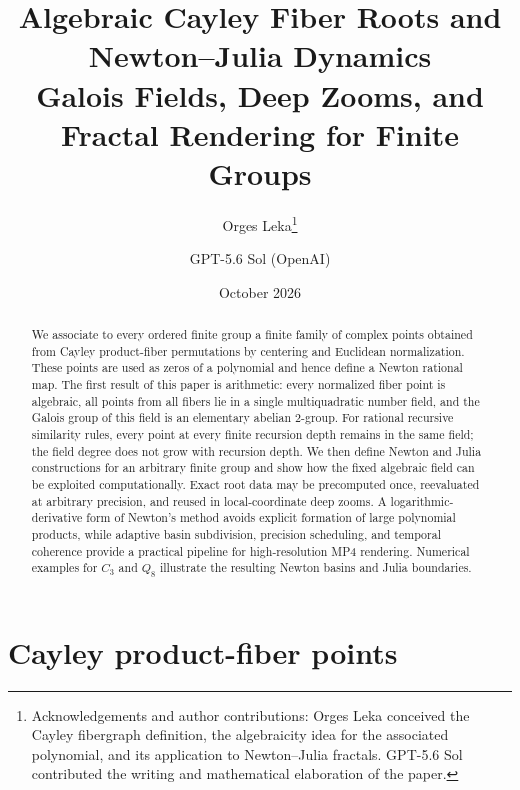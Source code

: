 \documentclass[11pt,a4paper]{article}
\title{\textbf{Algebraic Cayley Fiber Roots and Newton--Julia Dynamics}\\
\large Galois Fields, Deep Zooms, and Fractal Rendering for Finite Groups}
\author{%
Orges Leka\thanks{Acknowledgements and author contributions: Orges Leka conceived the Cayley fibergraph definition, the algebraicity idea for the associated polynomial, and its application to Newton--Julia fractals. GPT-5.6 Sol contributed the writing and mathematical elaboration of the paper.}%
\and
GPT-5.6 Sol (OpenAI)}
\date{October 2026}
\theoremstyle{definition}
\begin{document}
\maketitle

\begin{abstract}
We associate to every ordered finite group a finite family of complex points obtained from Cayley product-fiber permutations by centering and Euclidean normalization.  These points are used as zeros of a polynomial and hence define a Newton rational map.  The first result of this paper is arithmetic: every normalized fiber point is algebraic, all points from all fibers lie in a single multiquadratic number field, and the Galois group of this field is an elementary abelian $2$-group.  For rational recursive similarity rules, every point at every finite recursion depth remains in the same field; the field degree does not grow with recursion depth.  We then define Newton and Julia constructions for an arbitrary finite group and show how the fixed algebraic field can be exploited computationally.  Exact root data may be precomputed once, reevaluated at arbitrary precision, and reused in local-coordinate deep zooms.  A logarithmic-derivative form of Newton's method avoids explicit formation of large polynomial products, while adaptive basin subdivision, precision scheduling, and temporal coherence provide a practical pipeline for high-resolution MP4 rendering.  Numerical examples for $C_3$ and $Q_8$ illustrate the resulting Newton basins and Julia boundaries.
\end{abstract}

\section{Cayley product-fiber points}
\end{document}
